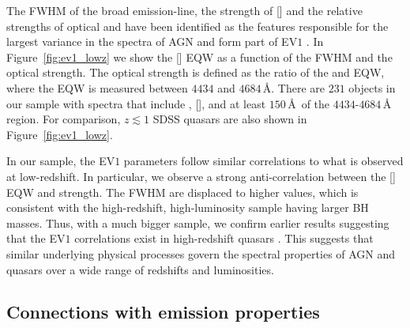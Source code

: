 The FWHM of the broad \hb emission-line, the strength of [] and the relative strengths of optical  and \hb have been identified as the features responsible for the largest variance in the spectra of AGN and form part of EV$1$ \citep{boroson92}.
In Figure~\ref{fig:ev1_lowz} we show the [] EQW as a function of the \hb FWHM and the optical  strength.
The optical  strength is defined as the ratio of the  and \hb EQW, where the  EQW is measured between $4434$ and $4684$\,\AA.
There are $231$ objects in our sample with spectra that include \hbns, [], and at least $150$\,\AA\, of the $4434$-$4684$\,\AA\,  region.
For comparison, $z\lesssim1$ SDSS quasars are also shown in Figure~\ref{fig:ev1_lowz}.

In our sample, the EV$1$ parameters follow similar correlations to what is observed at low-redshift.
In particular, we observe a strong anti-correlation between the [] EQW and  strength.
The \hb FWHM are displaced to higher values, which is consistent with the high-redshift, high-luminosity sample having larger BH masses.
Thus, with a much bigger sample, we confirm earlier results suggesting that the EV$1$ correlations exist in high-redshift quasars \citep[e.g.][]{netzer04,sulentic04,sulentic06,runnoe13,shen16a}.
This suggests that similar underlying physical processes govern the spectral properties of AGN and quasars over a wide range of redshifts and luminosities.

\subsection{Connections with  emission properties}
\label{sec:ch4-civtrends}

